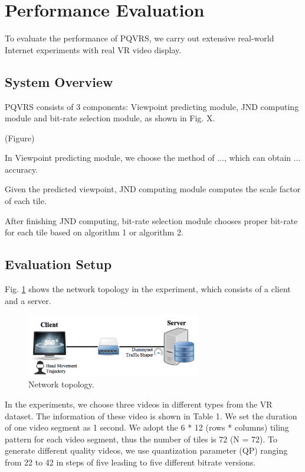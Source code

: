 \section{Performance Evaluation}

To evaluate the performance of PQVRS, we carry out extensive real-world Internet experiments with real VR video display.

\subsection{System Overview}

PQVRS consists of 3 components: Viewpoint predicting module, JND computing module and bit-rate selection module, as shown in Fig. X.

(Figure)

In Viewpoint predicting module, we choose the method of ..., which can obtain ... accuracy.

Given the predicted viewpoint, JND computing module computes the scale factor of each tile.

After finishing JND computing, bit-rate selection module chooses proper bit-rate for each tile based on algorithm 1 or algorithm 2.

\subsection{Evaluation Setup}

Fig. \ref{network} shows the network topology in the experiment, which consists of a client and a server.

\begin{figure}
  \centering
  \includegraphics[width=3in]{images/network.jpg}
  \caption{Network topology.}
  \label{network}
  \end{figure}

In the experiments, we choose three videos in different types from the VR dataset. The information of these video is shown in Table 1. We set the duration of one video segment as 1 second. We adopt the 6 * 12 (rows * columns) tiling pattern for each video segment, thus the number of tiles is 72 (N = 72). To generate different quality videos, we use quantization parameter (QP) ranging from 22 to 42 in steps of five leading to five different bitrate versions. 

